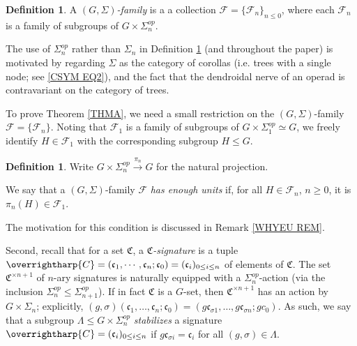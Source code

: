 \documentclass[a4paper,10pt
,draft
]{article}%
\numberwithin{equation}{section}
\numberwithin{figure}{section}
\theoremstyle{definition} %
\newtheorem{definition}[equation]{Definition}%
\newcommand{\vect}[1]{\text{\overrightharp{\ensuremath{#1}}}}
\newcommand{\F}{\ensuremath{\mathcal F}}
\newcommand{\1}{\ensuremath{\mathbbm 1}}%
\begin{document}
\begin{definition}\label{FAM1ST DEF}
	A \emph{$(G,\Sigma)$-family} is a
	a collection
	$\mathcal{F} = \{\mathcal{F}_n\}_{n \leq 0}$,
	where each $\mathcal{F}_n$
	is a family of subgroups of $G \times \Sigma_n^{op}$.
\end{definition}
The use of $\Sigma_n^{op}$ rather than $\Sigma_n$
in Definition \ref{FAM1ST DEF} 
(and throughout the paper) 
is motivated by regarding $\Sigma$
as the category of corollas (i.e. trees with a single node; 
see %
\eqref{CSYM EQ2}),
and the fact that the dendroidal nerve \cite[\S 1]{MW07} of an operad is contravariant on the category of trees.


To prove Theorem \ref{THMA}, we need a small restriction on the 
$(G,\Sigma)$-family $\mathcal{F} = \{\F_n\}$.
Noting that $\F_1$ is a family of subgroups of 
$G \times \Sigma_1^{op} \simeq G$,
we freely identify 
$H \in \F_1$ with the corresponding subgroup $H \leq G$.

\begin{definition}\label{FAMRESUNI DEF}
	Write $G \times \Sigma_n^{op} \xrightarrow{\pi_n} 
	G$
	for the natural projection.
	
	We say that a $(G,\Sigma)$-family $\F$ 
	\emph{has enough units}	if,
	for all $H \in \F_n$, $n\geq 0$,
	it is $\pi_n(H) \in \F_1$.
\end{definition}
\noindent The motivation for this condition is discussed in Remark \ref{WHYEU REM}.

Second, recall that for a set $\mathfrak C$, a \textit{$\mathfrak C$-signature}
is a tuple
$\vect{C} = (\mathfrak{c}_1,\cdots,\mathfrak{c}_n;\mathfrak{c}_0) = (\mathfrak c_i)_{0 \leq i \leq n}$
of elements of $\mathfrak C$.
The set $\mathfrak C^{\times n+1}$ of $n$-ary signatures is naturally equipped with a $\Sigma_n^{op}$-action
(via the inclusion $\Sigma_n^{op} \leq \Sigma_{n+1}^{op}$).
If in fact $\mathfrak C$ is a $G$-set, then
$\mathfrak C^{\times n+1}$ has an action by $G \times \Sigma_n$;
explicitly, 
$(g,\sigma)(\mathfrak c_1, \dots, \mathfrak c_n; \mathfrak c_0) = (g \mathfrak c_{\sigma 1}, \dots, g \mathfrak c_{\sigma n}; g c_0)$.
As such, we say that a subgroup 
$\Lambda \leq G \times \Sigma_n^{op}$
\emph{stabilizes} a signature $\vect{C} = (\mathfrak c_i)_{0 \leq i \leq n}$ if
$g \mathfrak c_{\sigma i} = \mathfrak c_i$ for all $(g,\sigma) \in \Lambda$.
\end{document}
